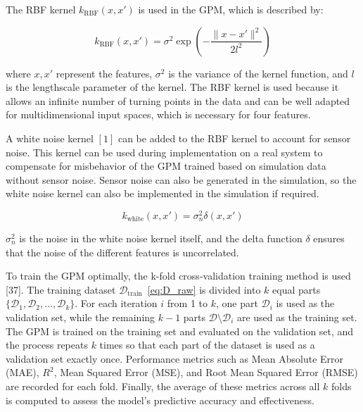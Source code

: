     The RBF kernel \( k_{\text{RBF}}(x, x') \) is used in the GPM, which is described by:
    
    \begin{equation}
    k_{\text{RBF}}(x, x') = \sigma^2 \exp \left( -\frac{\| x - x' \|^2}{2l^2} \right)
    \label{eq:rbf_kernel}
    \end{equation}
    
    where \( x, x' \) represent the features, \( \sigma^2 \) is the variance of the kernel function, and \( l \) is the lengthscale parameter of the kernel. The RBF kernel is used because it allows an infinite number of turning points in the data and can be well adapted for multidimensional input spaces, which is necessary for four features.
    
    A white noise kernel \([1]\) can be added to the RBF kernel to account for sensor noise. This kernel can be used during implementation on a real system to compensate for misbehavior of the GPM trained based on simulation data without sensor noise. Sensor noise can also be generated in the simulation, so the white noise kernel can also be implemented in the simulation if required.
    
    \begin{equation}
    k_{\text{white}}(x, x') = \sigma_n^2 \delta(x, x')
    \label{eq:white_kernel}
    \end{equation}
    
    \(\sigma_n^2\) is the noise in the white noise kernel itself, and the delta function \( \delta \) ensures that the noise of the different features is uncorrelated.

    \vspace{1em}
    To train the GPM optimally, the k-fold cross-validation training method is used [37]. The training dataset \(\mathcal{D}_{\text{train}}\)~\eqref{eq:D_raw} is divided into \(k\) equal parts \(\{\mathcal{D}_1, \mathcal{D}_2, \ldots, \mathcal{D}_k\}\). For each iteration \(i\) from 1 to \(k\), one part \(\mathcal{D}_i\) is used as the validation set, while the remaining \(k - 1\) parts \(\mathcal{D} \setminus \mathcal{D}_i\) are used as the training set. The GPM is trained on the training set and evaluated on the validation set, and the process repeats \(k\) times so that each part of the dataset is used as a validation set exactly once. Performance metrics such as Mean Absolute Error (MAE), \(R^2\), Mean Squared Error (MSE), and Root Mean Squared Error (RMSE) are recorded for each fold. Finally, the average of these metrics across all \(k\) folds is computed to assess the model's predictive accuracy and effectiveness.

